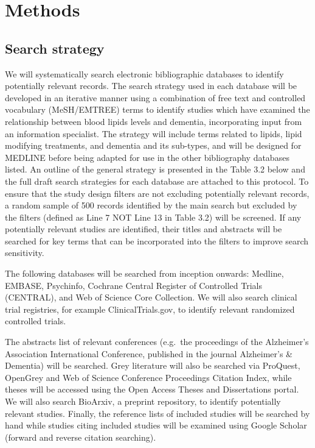 \documentclass[a4paper, nobind]{templates/ociamthesis}
\begin{document}
\hypertarget{methods}{%
\section{Methods}\label{methods}}

\hypertarget{search-strategy}{%
\subsection{Search strategy}\label{search-strategy}}

We will systematically search electronic bibliographic databases to identify potentially relevant records. The search strategy used in each database will be developed in an iterative manner using a combination of free text and controlled vocabulary (MeSH/EMTREE) terms to identify studies which have examined the relationship between blood lipids levels and dementia, incorporating input from an information specialist. The strategy will include terms related to lipids, lipid modifying treatments, and dementia and its sub-types, and will be designed for MEDLINE before being adapted for use in the other bibliography databases listed. An outline of the general strategy is presented in the Table 3.2 below and the full draft search strategies for each database are attached to this protocol. To ensure that the study design filters are not excluding potentially relevant records, a random sample of 500 records identified by the main search but excluded by the filters (defined as Line 7 NOT Line 13 in Table 3.2) will be screened. If any potentially relevant studies are identified, their titles and abstracts will be searched for key terms that can be incorporated into the filters to improve search sensitivity.

The following databases will be searched from inception onwards: Medline, EMBASE, Psychinfo, Cochrane Central Register of Controlled Trials (CENTRAL), and Web of Science Core Collection. We will also search clinical trial registries, for example ClinicalTrials.gov, to identify relevant randomized controlled trials.

The abstracts list of relevant conferences (e.g.~the proceedings of the Alzheimer's Association International Conference, published in the journal Alzheimer's \& Dementia) will be searched. Grey literature will also be searched via ProQuest, OpenGrey and Web of Science Conference Proceedings Citation Index, while theses will be accessed using the Open Access Theses and Dissertations portal. We will also search BioArxiv, a preprint repository, to identify potentially relevant studies. Finally, the reference lists of included studies will be searched by hand while studies citing included studies will be examined using Google Scholar (forward and reverse citation searching).
\end{document}
